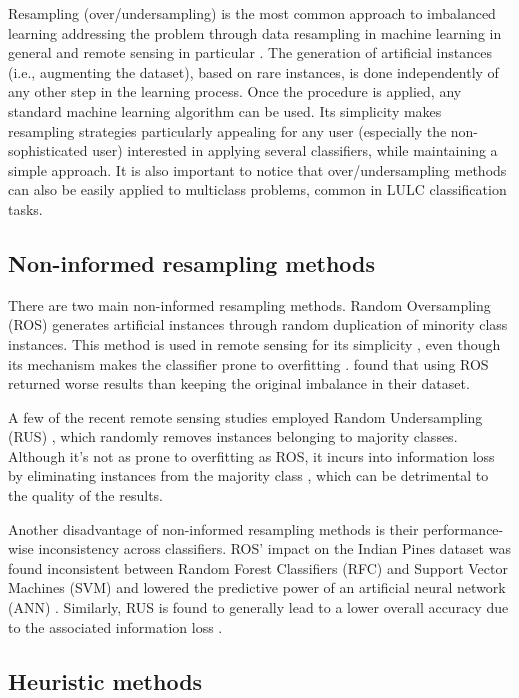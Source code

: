 \documentclass[authoryear,preprint,12pt]{elsarticle}
\begin{document}
\begin{linenumbers}
Resampling (over/undersampling) is the most common approach to imbalanced
learning addressing the problem through data resampling in machine learning in
general and remote sensing in particular \citep{Feng2019}. The generation of
artificial instances (i.e., augmenting the dataset), based on rare instances,
is done independently of any other step in the learning process. Once the
procedure is applied, any standard machine learning algorithm can be used. Its
simplicity makes resampling strategies particularly appealing for any user
(especially the non-sophisticated user) interested in applying several
classifiers, while maintaining a simple approach.  It is also important to
notice that over/undersampling methods can also be easily applied to
multiclass problems, common in LULC classification tasks.

\subsection{Non-informed resampling methods}

There are two main non-informed resampling methods. Random Oversampling (ROS)
generates artificial instances through random duplication of minority class
instances. This method is used in remote sensing for its simplicity
\citep{Sharififar2019, Hounkpatin2018}, even though its mechanism makes the
classifier prone to overfitting \citep{Krawczyk2016}. \cite{Hounkpatin2018}
found that using ROS returned worse results than keeping the original
imbalance in their dataset.

A few of the recent remote sensing studies employed Random Undersampling (RUS)
\citep{Ferreira2019}, which randomly removes instances belonging to majority
classes. Although it's not as prone to overfitting as ROS, it incurs into
information loss by eliminating instances from the majority class
\citep{Feng2019}, which can be detrimental to the quality of the results.

Another disadvantage of non-informed resampling methods is their
performance-wise inconsistency across classifiers. ROS' impact on the Indian
Pines dataset was found inconsistent between Random Forest Classifiers (RFC)
and Support Vector Machines (SVM) and lowered the predictive power of an
artificial neural network (ANN) \citep{Maxwell2018}. Similarly, RUS is found to
generally lead to a lower overall accuracy due to the associated information
loss \citep{Maxwell2018}.

\subsection{Heuristic methods}


\end{linenumbers}
\end{document}
